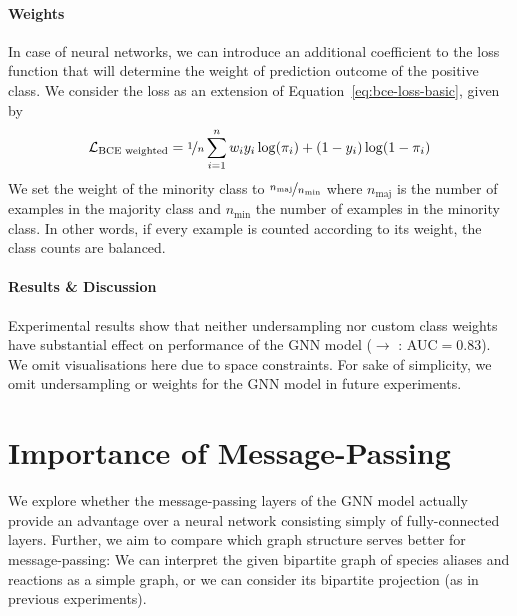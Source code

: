 \documentclass[
	fontsize=10pt, %
	twoside=false, %
	secnumdepth=1, %
  toc=indentunnumbered %
]{kaobook}
\begin{document}
\paragraph{Weights} In case of neural networks, we can introduce an additional
coefficient to the loss function that will determine the weight of prediction
outcome of the positive class.
%
We consider the  loss as
an extension of Equation~\ref{eq:bce-loss-basic}, given by
\begin{align}
  \label{eq:bce-loss-weighted}
  \mathcal{L}_{\text{BCE weighted}} = \nicefrac{1}{n} \sum_{i=1}^n w_i y_i \log(\pi_i) + (1-y_i) \log (1-\pi_i)
\end{align}
We set the weight of the minority class to
$\nicefrac{n_{\text{maj}}}{n_{\text{min}}}$ where $n_{\text{maj}}$ is the number
of examples in the majority
class and $n_{\text{min}}$ the number of examples in the minority class. In
other words, if every example is counted according to its weight, the class
counts are balanced.

\paragraph{Results \& Discussion} Experimental results show that neither
undersampling nor custom class weights have substantial effect on performance of
the GNN model (\ADLast $\rightarrow$ \PDMap: AUC$=0.83$).
We omit visualisations here due to space constraints.
For sake of simplicity, we omit undersampling or weights for the GNN model in future experiments.



\section{Importance of Message-Passing}
\label{sec:importance-message-passing}

We explore whether the message-passing layers of the GNN model actually provide
an advantage over a neural network
consisting simply of fully-connected layers. Further, we aim to compare which
graph structure serves better for message-passing: We can interpret the given
bipartite graph of species aliases and reactions as a simple graph, or we can
consider its bipartite projection (as in previous experiments).
\end{document}
